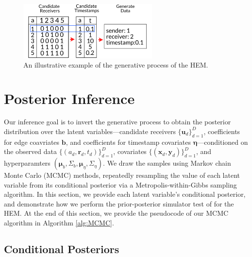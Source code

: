 \documentclass[ba]{imsart}
\numberwithin{equation}{section}
\theoremstyle{plain}
\begin{document}
					\begin{figure}[ht]
						\centering
						\includegraphics[width=0.625\textwidth]{img/diagram2.png}	
						\caption {An illustrative example of the generative process of the HEM.}
						\label{figure:diagram}
					\end{figure}	
					
\section{Posterior Inference}\label{sec:inference}
Our inference goal is to invert the generative process to obtain the posterior distribution over the latent variables---candidate receivers $\{\boldsymbol{u}_d\}_{d=1}^D$, coefficients for edge coavriates $\boldsymbol{b}$, and coefficients for timestamp covariates $\boldsymbol{\eta}$---conditioned on the observed data $\{(a_d, \boldsymbol{r}_d, t_d)\}_{d=1}^D$, covariates $\{(\boldsymbol{x}_d, \boldsymbol{y}_d)\}_{d=1}^D$, and hyperparamters $(\boldsymbol{\mu}_b, \Sigma_b, \boldsymbol{\mu}_\eta, \Sigma_\eta)$. We draw the samples using Markov chain Monte Carlo (MCMC) methods, repeatedly resampling the value of each latent variable from its conditional posterior via a Metropolis-within-Gibbs sampling algorithm. In this section, we provide each latent variable's conditional posterior, and demonstrate how we perform the prior-posterior simulator test of \cite{geweke2004getting} for the HEM. At the end of this section, we provide the pseudocode of our MCMC algorithm in Algorithm \ref{alg:MCMC}.

\subsection{Conditional Posteriors}\label{subsec:conditionaldist}
\end{document}
